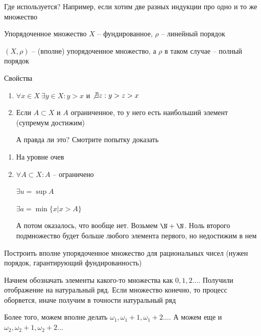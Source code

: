 \documentclass[12pt]{article}
\begin{document}
\begin{Example}{Где используется?}
    Например, если хотим две разных индукции про одно и то же множество
\end{Example}

\begin{defin}{Упорядоченное множество}
    $X$ -- фундированное, $\rho$ -- линейный порядок

    $(X, \rho)$ -- (вполне) упорядоченное множество, а $\rho$ в таком случае -- полный порядок
\end{defin}

\begin{theo}{Свойства}
    \begin{enumerate}
        \item $\forall x \in X\ \exists y \in X : y > x$ и $\not\exists z : y > z > x$
        \item Если $A \subset X$ и $A$ ограниченное, то у него есть наибольший элемент (супремум достижим)
        
        А правда ли это? Смотрите попытку доказать
    \end{enumerate}
\end{theo}

\begin{Proof}{}

\begin{enumerate}
    \item На уровне очев 
    \item $\forall A \subset X : A$ -- ограничено 
    
    $\exists u = \sup A$

    $\exists a = \min \{ x | x > A \}$

    А потом оказалось, что вообще нет. Возьмем $\N + \N$. Ноль второго подмножество будет больше любого элемента первого, но недостижим в нем
\end{enumerate}

\end{Proof}

\begin{Exercise}{}
    Построить вполне упорядоченное множество для рациональных чисел (нужен порядок, гарантирующий фундированность)
\end{Exercise}

Начнем обозначать элементы какого-то множества как $0, 1, 2 \ldots$. Получили отображение на натуральный ряд. Если множество конечно, то процесс оборвется, иначе получим в точности натуральный ряд

Более того, можем вполне делать $\omega_1, \omega_1 + 1, \omega_1 + 2 \ldots$. А можем еще и $\omega_2, \omega_2 + 1, \omega_2 + 2 \ldots$
\end{document}
